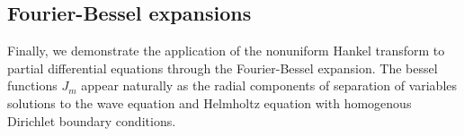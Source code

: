 

\subsection{Fourier-Bessel expansions}

Finally, we demonstrate the application of the nonuniform Hankel transform to
partial differential equations through the Fourier-Bessel expansion. The bessel
functions $J_m$ appear naturally as the radial components of separation of
variables solutions to the wave equation and Helmholtz equation with homogenous
Dirichlet boundary conditions.

